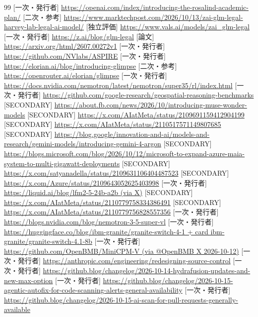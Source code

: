 \documentclass[lualatex,a4paper,10pt]{jlreq}
\begin{document}
\begin{thebibliography}{99}
 [一次・発行者] \url{https://openai.com/index/introducing-the-rosalind-academic-plan/}
 [二次・参考] \url{https://www.marktechpost.com/2026/10/13/zai-glm-legal-harvey-lab-legal-ai-model/}
 [独立評価] \url{https://www.vals.ai/models/zai_glm-legal}
 [一次・発行者] \url{https://z.ai/blog/glm-legal}
 [論文] \url{https://arxiv.org/html/2607.00272v1}
 [一次・発行者] \url{https://github.com/NVlabs/ASPIRE}
 [一次・発行者] \url{https://elorian.ai/blog/introducing-glimpse}
 [二次・参考] \url{https://openrouter.ai/elorian/glimpse}
 [一次・発行者] \url{https://docs.nvidia.com/nemotron/latest/nemotron/super35/rl/index.html}
 [一次・発行者] \url{https://github.com/google-research/geospatial-reasoning-benchmarks}
 [SECONDARY] \url{https://about.fb.com/news/2026/10/introducing-muse-wonder-models}
 [SECONDARY] \url{https://x.com/AIatMeta/status/2109691159412904199}
 [SECONDARY] \url{https://x.com/AIatMeta/status/2110517571149807685}
 [SECONDARY] \url{https://blog.google/innovation-and-ai/models-and-research/gemini-models/introducing-gemini-4-argon}
 [SECONDARY] \url{https://blogs.microsoft.com/blog/2026/10/12/microsoft-to-expand-azure-maia-system-to-multi-gigawatt-deployments}
 [SECONDARY] \url{https://x.com/satyanadella/status/2109631106404487523}
 [SECONDARY] \url{https://x.com/Azure/status/2109643052625403998}
 [一次・発行者] \url{https://liquid.ai/blog/lfm2-5-24b-a2b (via X)}
 [SECONDARY] \url{https://x.com/AIatMeta/status/2110779758334386491}
 [SECONDARY] \url{https://x.com/AIatMeta/status/2110779756828557356}
 [一次・発行者] \url{https://blogs.nvidia.com/blog/nemotron-3-5-super-vl}
 [一次・発行者] \url{https://huggingface.co/blog/ibm-granite/granite-switch-4-1 + card ibm-granite/granite-switch-4.1-8b}
 [一次・発行者] \url{https://github.com/OpenBMB/MiniCPM-V (via @OpenBMB X 2026-10-12)}
 [一次・発行者] \url{https://anthropic.com/engineering/redesigning-source-control}
 [一次・発行者] \url{https://github.blog/changelog/2026-10-14-hydrafusion-updates-and-new-max-option}
 [一次・発行者] \url{https://github.blog/changelog/2026-10-15-agentic-autofix-for-code-scanning-alerts-general-availability}
 [一次・発行者] \url{https://github.blog/changelog/2026-10-15-ai-scan-for-pull-requests-generally-available}

\end{thebibliography}
\end{document}
